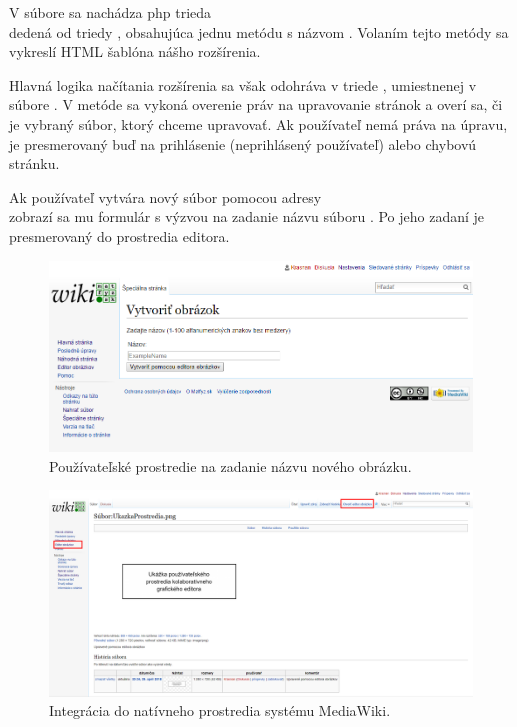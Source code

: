 V súbore  sa nachádza php trieda \\
 dedená od triedy , obsahujúca jednu metódu s názvom . Volaním tejto metódy sa vykreslí HTML šablóna nášho rozšírenia.

Hlavná logika načítania rozšírenia sa však odohráva v triede , umiestnenej v súbore . V metóde  sa vykoná overenie práv na upravovanie stránok a overí sa, či je vybraný súbor, ktorý chceme upravovať. Ak používateľ nemá práva na úpravu, je presmerovaný buď na prihlásenie (neprihlásený používateľ) alebo chybovú stránku.

Ak používateľ vytvára nový súbor pomocou adresy \\
 zobrazí sa mu formulár s výzvou na zadanie názvu súboru . Po jeho zadaní je presmerovaný do prostredia editora.

\begin{figure}[H]
	\centerline{\includegraphics[width=1\textwidth]{images/results/base-new}}
	\caption{Používateľské prostredie na zadanie názvu nového obrázku.}
	\label{obr:base-new}
\end{figure}

\begin{figure}[H]
	\centerline{\includegraphics[width=1\textwidth]{images/results/base-integration}}
	\caption{Integrácia do natívneho prostredia systému MediaWiki.}
	\label{obr:base-integration}
\end{figure}


